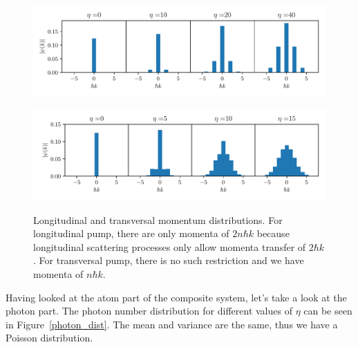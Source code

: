 \begin{figure}[!htb]
	\begin{minipage}[b]{1\linewidth}
	\centering
	\includegraphics[width=1\textwidth]{images/mom_long.pdf}
	\label{long_momentum}
	\end{minipage}
%
	\begin{minipage}[b]{1\linewidth}
	\centering
	\includegraphics[width=1\textwidth]{images/mom_trans.pdf}
	\label{trans_momentum}
	\end{minipage}
\caption{Longitudinal and transversal momentum distributions. For longitudinal pump, there are only momenta of $2 n \hbar k$ because longitudinal scattering processes only allow momenta transfer of $2 \hbar k$. For transversal pump, there is no such restriction and we have momenta of $n \hbar k$.}
\label{momenta}
\end{figure}
\FloatBarrier

\noindent Having looked at the atom part of the composite system, let's take a look at the photon part. The photon number distribution for different values of $\eta$ can be seen in Figure~\ref{photon_dist}. The mean and variance are the same, thus we have a Poisson distribution.


